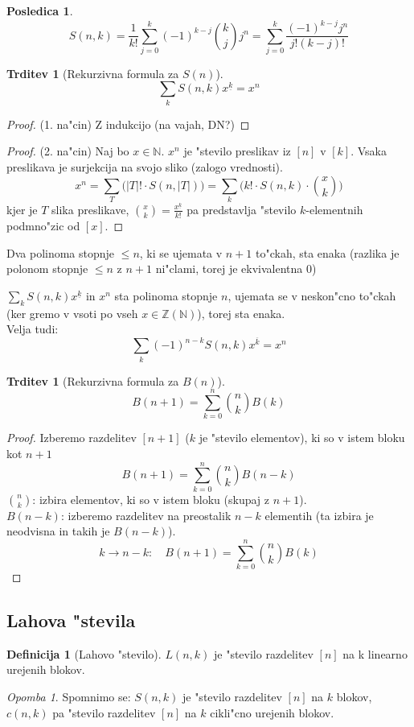 \documentclass[a4paper,12pt]{article}
\theoremstyle{definition}
\newtheorem{defn}[counter]{Definicija}
\newtheorem{conseq}[counter]{Posledica}
\newtheorem{claim}[counter]{Trditev}
\theoremstyle{remark}
\newtheorem*{rem}{Opomba}
\newcommand{\N}{\mathbb{N}}
\newcommand{\Z}{\mathbb{Z}}
\begin{document}
\begin{conseq}
	\[S(n,k) = \frac{1}{k!} \sum_{j=0}^k (-1)^{k-j} \binom{k}{j}j^n = \sum_{j=0}^k \frac{(-1)^{k-j} j^n}{j! (k-j)!}\]
\end{conseq}

\begin{claim}[Rekurzivna formula za $S(n)$]
    \[\sum_k S(n,k)x^{\underline{k}} = x^n\]
\end{claim}

\begin{proof}(1. na"cin)
	Z indukcijo (na vajah, DN?)
\end{proof}
\begin{proof}(2. na"cin)
    Naj bo $x \in \N$.
    $x^n$ je "stevilo preslikav iz $[n]$ v $[k]$.
    Vsaka preslikava je surjekcija na svojo sliko (zalogo vrednosti).
    \[x^n = \sum_T \big(|T|! \cdot S(n,|T|)\big) = \sum_k \big(k! \cdot S(n,k) \cdot \binom{x}{k}\big)\]
    kjer je $T$ slika preslikave, $\binom{x}{k} = \frac{x^{\underline{k}}}{k!}$ pa predstavlja "stevilo $k$-elementnih podmno"zic od $[x]$.
\end{proof}

\label{TODO: surprise analiza? kaj so te polinomi kle?}
Dva polinoma stopnje $\leq n$, ki se ujemata v $n+1$ to"ckah, sta enaka (razlika je polonom stopnje $\leq n$ z $n+1$ ni"clami, torej je ekvivalentna 0)

$\sum_k S(n,k)x^{\underline{k}}$ in $x^n$ sta polinoma stopnje $n$, ujemata se v neskon"cno to"ckah (ker gremo v vsoti po vseh $x \in \Z(\N)$), torej sta enaka.
\\
Velja tudi: \[\sum_k (-1)^{n-k} S(n,k) x^{\overline{k}} = x^n\]

\begin{claim}[Rekurzivna formula za $B(n)$]
    \[B(n+1) = \sum_{k=0}^n \binom{n}{k} B(k)\]
\end{claim}

\begin{proof}
    Izberemo razdelitev $[n+1]$ ($k$ je "stevilo elementov), ki so v istem bloku kot $n+1$
    \[B(n+1) = \sum_{k=0}^n \binom{n}{k}B(n-k)\]
    $\binom{n}{k}$: izbira elementov, ki so v istem bloku (skupaj z $n+1$). \\
    $B(n-k)$: izberemo razdelitev na preostalik $n-k$ elementih (ta izbira je neodvisna in takih je $B(n-k)$).
    \[k \rightarrow n-k: \quad B(n+1) = \sum_{k=0}^n \binom{n}{k}B(k)\]
\end{proof}

\subsection{Lahova "stevila}
\begin{defn}[Lahovo "stevilo]
	$L(n,k)$ je "stevilo razdelitev $[n]$ na k linearno urejenih blokov.
\end{defn}
\begin{rem}
	Spomnimo se: $S(n,k)$ je "stevilo razdelitev $[n]$ na $k$ blokov, $c(n,k)$ pa "stevilo razdelitev $[n]$ na $k$ cikli"cno urejenih blokov.
\end{rem}
\end{document}
